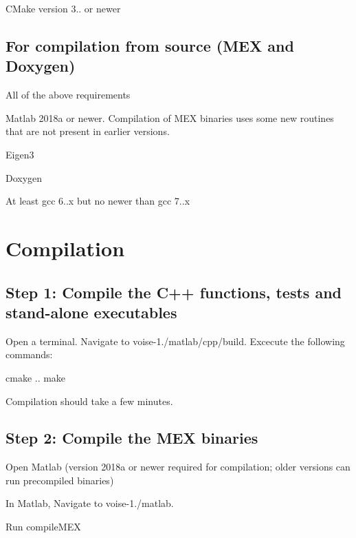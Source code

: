 \begin{DoxyItemize}
\item C\+Make version 3.. or newer
\end{DoxyItemize}\hypertarget{index_comp_sec}{}\subsection{For compilation from source (\+M\+E\+X and Doxygen)}\label{index_comp_sec}

\begin{DoxyItemize}
\item All of the above requirements
\item Matlab 2018a or newer. Compilation of M\+EX binaries uses some new routines that are not present in earlier versions.
\item Eigen3
\item Doxygen
\item At least gcc 6..\+x but no newer than gcc 7..\+x
\end{DoxyItemize}\hypertarget{index_install_sec}{}\section{Compilation}\label{index_install_sec}
\hypertarget{index_step1}{}\subsection{Step 1\+: Compile the C++ functions, tests and stand-\/alone executables}\label{index_step1}
Open a terminal. Navigate to {\ttfamily voise-\/1./matlab/cpp/build}. Excecute the following commands\+: \begin{DoxyVerb}    cmake ..
    make
\end{DoxyVerb}


Compilation should take a few minutes.\hypertarget{index_step2}{}\subsection{Step 2\+: Compile the M\+E\+X binaries}\label{index_step2}

\begin{DoxyEnumerate}
\item Open Matlab (version 2018a or newer required for compilation; older versions can run precompiled binaries)
\item In Matlab, Navigate to {\ttfamily voise-\/1./matlab}.
\item Run {\ttfamily compile\+M\+EX}
\end{DoxyEnumerate}

